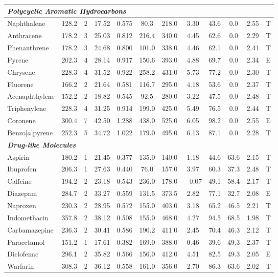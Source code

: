 \documentclass[12pt,a4paper]{article}
\begin{document}
\begin{small}
\begin{longtable}{@{}p{2.8cm}ccccccccccc@{}}
\midrule
\multicolumn{12}{l}{\textit{\textbf{Polycyclic Aromatic Hydrocarbons}}} \\
\midrule
Naphthalene & 128.2 & 2 & 17.52 & 0.575 & 80.3 & 218.0 & 3.30 & 43.6 & 0.0 & 2.55 & T \\
Anthracene & 178.2 & 3 & 25.03 & 0.812 & 216.4 & 340.0 & 4.45 & 62.6 & 0.0 & 2.29 & T \\
Phenanthrene & 178.2 & 3 & 24.68 & 0.800 & 101.0 & 338.0 & 4.46 & 62.1 & 0.0 & 2.41 & T \\
Pyrene & 202.3 & 4 & 28.14 & 0.917 & 150.6 & 393.0 & 4.88 & 69.7 & 0.0 & 2.34 & E \\
Chrysene & 228.3 & 4 & 31.52 & 0.922 & 258.2 & 431.0 & 5.73 & 77.2 & 0.0 & 2.30 & T \\
Fluorene & 166.2 & 2 & 21.64 & 0.581 & 116.7 & 295.0 & 4.18 & 53.6 & 0.0 & 2.37 & T \\
Acenaphthylene & 152.2 & 2 & 18.82 & 0.545 & 92.5 & 280.0 & 3.22 & 47.5 & 0.0 & 2.48 & T \\
Triphenylene & 228.3 & 4 & 31.25 & 0.914 & 199.0 & 425.0 & 5.49 & 76.5 & 0.0 & 2.44 & T \\
Coronene & 300.4 & 7 & 42.50 & 1.288 & 438.0 & 525.0 & 6.05 & 98.2 & 0.0 & 2.55 & E \\
Benzo[$a$]pyrene & 252.3 & 5 & 34.72 & 1.022 & 179.0 & 495.0 & 6.13 & 87.1 & 0.0 & 2.28 & T \\

\midrule
\multicolumn{12}{l}{\textit{\textbf{Drug-like Molecules}}} \\
\midrule
Aspirin & 180.2 & 1 & 21.45 & 0.377 & 135.0 & 140.0 & 1.18 & 44.6 & 63.6 & 2.15 & T \\
Ibuprofen & 206.3 & 1 & 27.63 & 0.440 & 76.0 & 157.0 & 3.97 & 60.3 & 37.3 & 2.48 & T \\
Caffeine & 194.2 & 2 & 23.18 & 0.543 & 236.0 & 178.0 & $-$0.07 & 49.1 & 58.4 & 2.17 & T \\
Diazepam & 284.7 & 2 & 33.27 & 0.559 & 131.5 & 373.5 & 2.82 & 77.1 & 32.7 & 2.08 & E \\
Naproxen & 230.3 & 2 & 28.95 & 0.572 & 155.0 & 403.0 & 3.18 & 65.2 & 46.5 & 2.21 & T \\
Indomethacin & 357.8 & 2 & 38.12 & 0.508 & 155.0 & 468.0 & 4.27 & 94.5 & 68.5 & 1.98 & T \\
Carbamazepine & 236.3 & 2 & 30.41 & 0.586 & 190.2 & 411.0 & 2.45 & 70.4 & 46.3 & 2.12 & T \\
Paracetamol & 151.2 & 1 & 17.61 & 0.382 & 169.0 & 388.0 & 0.46 & 39.6 & 49.3 & 2.37 & T \\
Diclofenac & 296.1 & 2 & 35.82 & 0.566 & 156.0 & 412.0 & 4.51 & 82.5 & 49.3 & 2.05 & E \\
Warfarin & 308.3 & 2 & 36.12 & 0.558 & 161.0 & 356.0 & 2.70 & 86.3 & 63.6 & 2.02 & T \\


\end{longtable}
\end{small}
\end{document}
